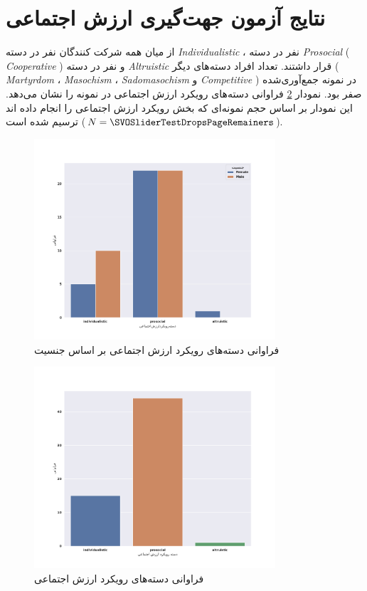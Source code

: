 \section{نتایج آزمون جهت‌گیری ارزش اجتماعی}
از میان همه شرکت کنندگان
\noOfIndividualisticParticipants
نفر در دسته
\textit{
    \gls{Individualistic}
}
،
\noOfCooperativeParticipants
نفر در دسته
\textit{
    \gls{Prosocial}
}\!(\textit{
    \gls{Cooperative}
})
و
\noOfAltruisticParticipants
نفر در دسته
\textit{
    \gls{Altruistic}
}
قرار داشتند.
تعداد افراد دسته‌های دیگر
\!(\!\textit{
    \gls{Martyrdom}
}،
\textit{
    \gls{Masochism}
}،
\textit{
    \gls{Sadomasochism}
} و
\textit{
    \gls{Competitive}
}\!)
در نمونه جمع‌آوری‌شده صفر بود.
نمودار \ref{fig:SVOAgainstPopulationBarPlot}
فراوانی دسته‌های رویکرد ارزش اجتماعی در نمونه را نشان می‌دهد. این نمودار بر اساس حجم نمونه‌ای که
بخش رویکرد ارزش اجتماعی را انجام داده اند ترسیم شده است
($N=\SVOSliderTestDropsPageRemainers$).

\begin{figure}[htpb]
    \centering
    \includegraphics[width=0.8\textwidth]{./img/SVOAgainstPopulationSexBarPlot.png}
    \caption{فراوانی دسته‌های رویکرد ارزش اجتماعی بر اساس جنسیت}
    \label{fig:SVOAgainstPopulationSexBarPlot}
\end{figure}
\begin{figure}[htpb]
    \centering
    \includegraphics[width=0.8\textwidth]{./img/SVOAgainstPopulationBarPlot.pdf}
    \caption{فراوانی دسته‌های رویکرد ارزش اجتماعی}
    \label{fig:SVOAgainstPopulationBarPlot}
\end{figure}
